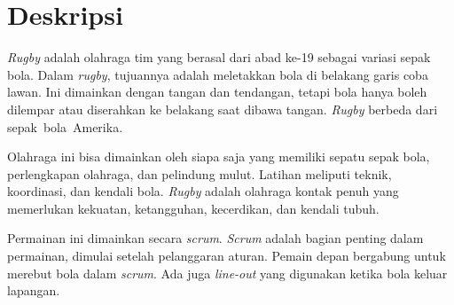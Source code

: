 \documentclass[a4paper,twoside]{article}
\begin{document}
\title{\@judultopik}
\author{\nama \textendash \@npm} 

\newcommand{\nama}{Nathanael Adi Trianto}
\newcommand{\@npm}{6181901041}
\newcommand{\@judultopik}{Pembuatan Ulang Aplikasi Rugby Indonesia dengan Ionic 7 dan Capacitor} %
\newcommand{\jumpemb}{1} %
\newcommand{\tanggal}{22/09/2023}


\maketitle


\section{Deskripsi}
\textit{Rugby} adalah olahraga tim yang berasal dari abad ke-19 sebagai variasi sepak bola. Dalam \textit{rugby}, tujuannya adalah meletakkan bola di belakang garis coba lawan. Ini dimainkan dengan tangan dan tendangan, tetapi bola hanya boleh dilempar atau diserahkan ke belakang saat dibawa tangan. \textit{Rugby} berbeda dari sepak~bola~Amerika.

Olahraga ini bisa dimainkan oleh siapa saja yang memiliki sepatu sepak bola, perlengkapan olahraga, dan pelindung mulut. Latihan meliputi teknik, koordinasi, dan kendali bola. \textit{Rugby} adalah olahraga kontak penuh yang memerlukan kekuatan, ketangguhan, kecerdikan, dan kendali tubuh.

Permainan ini dimainkan secara \textit{scrum}. \textit{Scrum} adalah bagian penting dalam permainan, dimulai setelah pelanggaran aturan. Pemain depan bergabung untuk merebut bola dalam \textit{scrum}. Ada juga \textit{line-out} yang digunakan ketika bola keluar lapangan.



\end{document}
